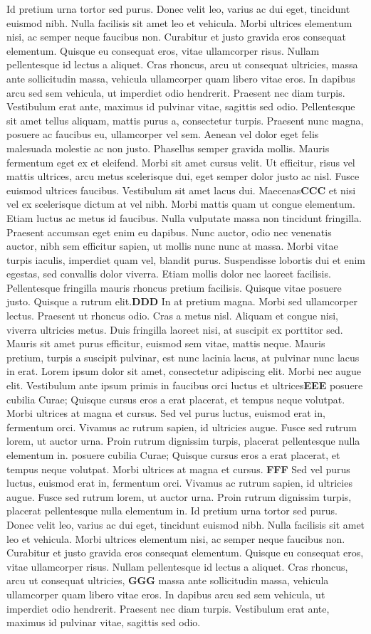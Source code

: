 \documentclass[twoside]{article}
\newcommand{\numpar}[1]{\doinsidelinehook{\markboth{#1}{#1}}\textbf{#1}}
\begin{document}
Id pretium urna tortor sed purus. Donec velit leo, varius ac dui eget, tincidunt euismod nibh. Nulla facilisis sit amet leo et vehicula. Morbi ultrices elementum nisi, ac semper neque faucibus non. Curabitur et justo gravida eros consequat elementum. Quisque eu consequat eros, vitae ullamcorper risus. Nullam pellentesque id lectus a aliquet. Cras rhoncus, arcu ut consequat ultricies, massa ante sollicitudin massa, vehicula ullamcorper quam libero vitae eros. In dapibus arcu sed sem vehicula, ut imperdiet odio hendrerit. Praesent nec diam turpis. Vestibulum erat ante, maximus id pulvinar vitae, sagittis sed odio. Pellentesque sit amet tellus aliquam, mattis purus a, consectetur turpis. Praesent nunc magna, posuere ac faucibus eu, ullamcorper vel sem. Aenean vel dolor eget felis malesuada molestie ac non justo. Phasellus semper gravida mollis. Mauris fermentum eget ex et eleifend. Morbi sit amet cursus velit. Ut efficitur, risus vel mattis ultrices, arcu metus scelerisque dui, eget semper dolor justo ac nisl. Fusce euismod ultrices faucibus. Vestibulum sit amet lacus dui. Maecenas\numpar{CCC} et nisi vel ex scelerisque dictum at vel nibh. Morbi mattis quam ut congue elementum. Etiam luctus ac metus id faucibus. Nulla vulputate massa non tincidunt fringilla. Praesent accumsan eget enim eu dapibus. Nunc auctor, odio nec venenatis auctor, nibh sem efficitur sapien, ut mollis nunc nunc at massa. Morbi vitae turpis iaculis, imperdiet quam vel, blandit purus. Suspendisse lobortis dui et enim egestas, sed convallis dolor viverra. Etiam mollis dolor nec laoreet facilisis. Pellentesque fringilla mauris rhoncus pretium facilisis. Quisque vitae posuere justo. Quisque a rutrum elit.\numpar{DDD} In at pretium magna. Morbi sed ullamcorper lectus. Praesent ut rhoncus odio. Cras a metus nisl. Aliquam et congue nisi, viverra ultricies metus. Duis fringilla laoreet nisi, at suscipit ex porttitor sed. Mauris sit amet purus efficitur, euismod sem vitae, mattis neque. Mauris pretium, turpis a suscipit pulvinar, est nunc lacinia lacus, at pulvinar nunc lacus in erat. Lorem ipsum dolor sit amet, consectetur adipiscing elit. Morbi nec augue elit. Vestibulum ante ipsum primis in faucibus orci luctus et ultrices\numpar{EEE} posuere cubilia Curae; Quisque cursus eros a erat placerat, et tempus neque volutpat. Morbi ultrices at magna et cursus. Sed vel purus luctus, euismod erat in, fermentum orci. Vivamus ac rutrum sapien, id ultricies augue. Fusce sed rutrum lorem, ut auctor urna. Proin rutrum dignissim turpis, placerat pellentesque nulla elementum in. posuere cubilia Curae; Quisque cursus eros a erat placerat, et tempus neque volutpat. Morbi ultrices at magna et cursus. \numpar{FFF} Sed vel purus luctus, euismod erat in, fermentum orci. Vivamus ac rutrum sapien, id ultricies augue. Fusce sed rutrum lorem, ut auctor urna. Proin rutrum dignissim turpis, placerat pellentesque nulla elementum in. Id pretium urna tortor sed purus. Donec velit leo, varius ac dui eget, tincidunt euismod nibh. Nulla facilisis sit amet leo et vehicula. Morbi ultrices elementum nisi, ac semper neque faucibus non. Curabitur et justo gravida eros consequat elementum. Quisque eu consequat eros, vitae ullamcorper risus. Nullam pellentesque id lectus a aliquet. Cras rhoncus, arcu ut consequat ultricies, \numpar{GGG} massa ante sollicitudin massa, vehicula ullamcorper quam libero vitae eros. In dapibus arcu sed sem vehicula, ut imperdiet odio hendrerit. Praesent nec diam turpis. Vestibulum erat ante, maximus id pulvinar vitae, sagittis sed odio.

\endnumbering
\end{document}
